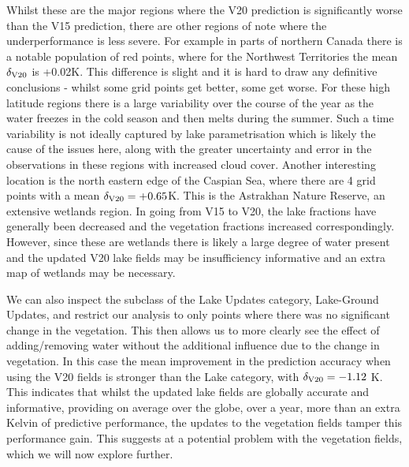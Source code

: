 \documentclass[twocolumn]{article}
\begin{document}
\noindent Whilst these are the major regions where the V20 prediction is significantly worse than the V15 prediction, there are other regions of note where the underperformance is less severe. For example in parts of northern Canada there is a notable population of red points, where for the Northwest Territories the mean $\delta_{\rm V20}$  is +0.02K. This difference is slight and it is hard to draw any definitive conclusions - whilst some grid points get better, some get worse. For these high latitude regions there is a large variability over the course of the year as the water freezes in the cold season and then melts during the summer. Such a time variability is not ideally captured by lake parametrisation which is likely the cause of the issues here, along with the greater uncertainty and error in the observations in these regions with increased cloud cover. Another interesting location is the north eastern edge of the Caspian Sea, where there are 4 grid points with a mean $\delta_{\rm V20}=+0.65$K. This is the Astrakhan Nature Reserve, an extensive wetlands region. In going from V15 to V20, the lake fractions have generally been decreased and the vegetation fractions increased correspondingly. However, since these are wetlands there is likely a large degree of water present and the updated V20 lake fields may be insufficiency informative and an extra map of wetlands may be necessary. \newline 


\noindent We can also inspect the subclass of the Lake Updates category, Lake-Ground Updates, and restrict our analysis to only points where there was no significant change in the vegetation. This then allows us to more clearly see the effect of adding/removing water without the additional influence due to the change in vegetation. In this case the mean improvement in the prediction accuracy when using the V20 fields is stronger than the Lake category, with $\delta_{\rm V20} = -1.12$ K. This indicates that whilst the updated lake fields are globally accurate and informative, providing on average over the globe, over a year, more than an extra Kelvin of predictive performance, the updates to the vegetation fields tamper this performance gain. This suggests at a potential problem with the vegetation fields, which we will now explore further.
\end{document}
